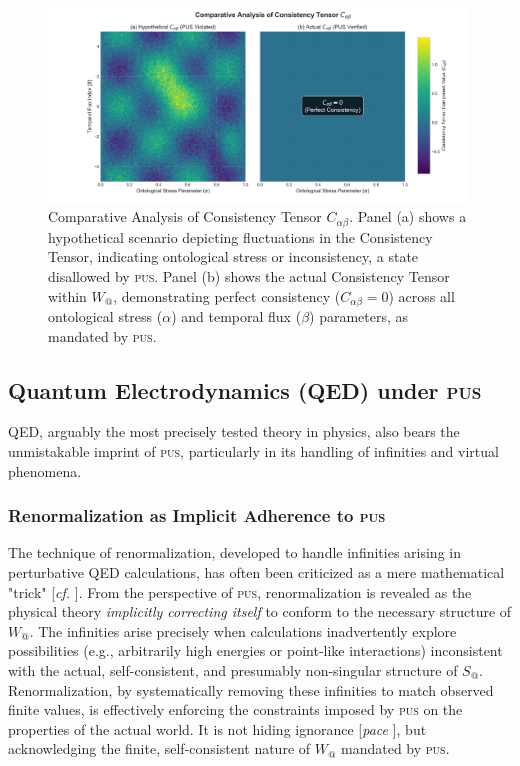 \documentclass[11pt, a4paper]{article}
\makeatletter
\newcommand{\pus}{\textsc{pus}} %
\newcommand{\Wactual}{W_{@}} %
\newcommand{\Sactual}{S_{@}} %
\makeatother
\begin{document}
\begin{figure}[htbp]
    \centering
    \includegraphics[width=0.99\textwidth]{figures/pus_figure2_consistency_comparison.png} %
    \caption{Comparative Analysis of Consistency Tensor $C_{\alpha\beta}$. Panel (a) shows a hypothetical scenario depicting fluctuations in the Consistency Tensor, indicating ontological stress or inconsistency, a state disallowed by \pus{}. Panel (b) shows the actual Consistency Tensor within $\Wactual$, demonstrating perfect consistency ($C_{\alpha\beta} = 0$) across all ontological stress ($\alpha$) and temporal flux ($\beta$) parameters, as mandated by \pus.}
    \label{fig:tensor}
\end{figure}
\FloatBarrier 

\subsection{Quantum Electrodynamics (QED) under \pus}
QED, arguably the most precisely tested theory in physics, also bears the unmistakable imprint of \pus, particularly in its handling of infinities and virtual phenomena.

\subsubsection{Renormalization as Implicit Adherence to \pus}
The technique of renormalization, developed to handle infinities arising in perturbative QED calculations, has often been criticized as a mere mathematical "trick" [\textit{cf.} \citealp{dirac_renormalization}]. From the perspective of \pus, renormalization is revealed as the physical theory \textit{implicitly correcting itself} to conform to the necessary structure of $\Wactual$. The infinities arise precisely when calculations inadvertently explore possibilities (e.g., arbitrarily high energies or point-like interactions) inconsistent with the actual, self-consistent, and presumably non-singular structure of $\Sactual$. Renormalization, by systematically removing these infinities to match observed finite values, is effectively enforcing the constraints imposed by \pus{} on the properties of the actual world. It is not hiding ignorance [\textit{pace} \citealp{dirac_renormalization}], but acknowledging the finite, self-consistent nature of $\Wactual$ mandated by \pus.
\end{document}
